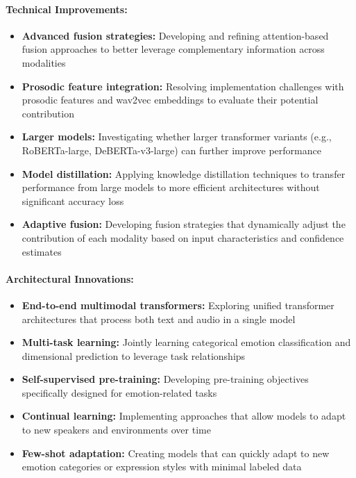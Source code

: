 \documentclass[12pt]{article}
\begin{document}
\paragraph{Technical Improvements:}
\begin{itemize}
    \item \textbf{Advanced fusion strategies:} Developing and refining attention-based fusion approaches to better leverage complementary information across modalities
    
    \item \textbf{Prosodic feature integration:} Resolving implementation challenges with prosodic features and wav2vec embeddings to evaluate their potential contribution
    
    \item \textbf{Larger models:} Investigating whether larger transformer variants (e.g., RoBERTa-large, DeBERTa-v3-large) can further improve performance
    
    \item \textbf{Model distillation:} Applying knowledge distillation techniques to transfer performance from large models to more efficient architectures without significant accuracy loss
    
    \item \textbf{Adaptive fusion:} Developing fusion strategies that dynamically adjust the contribution of each modality based on input characteristics and confidence estimates
\end{itemize}

\paragraph{Architectural Innovations:}
\begin{itemize}
    \item \textbf{End-to-end multimodal transformers:} Exploring unified transformer architectures that process both text and audio in a single model
    
    \item \textbf{Multi-task learning:} Jointly learning categorical emotion classification and dimensional prediction to leverage task relationships
    
    \item \textbf{Self-supervised pre-training:} Developing pre-training objectives specifically designed for emotion-related tasks
    
    \item \textbf{Continual learning:} Implementing approaches that allow models to adapt to new speakers and environments over time
    
    \item \textbf{Few-shot adaptation:} Creating models that can quickly adapt to new emotion categories or expression styles with minimal labeled data
\end{itemize}
\end{document}
